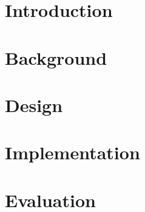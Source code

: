 \documentclass[a4paper,twoside,10pt]{report}
\begin{document}
\newpage


\pagestyle{fancy}
\fancyfoot{}
\fancyfoot[LE,RO]{\thepage}



\chapter{Introduction}


\chapter{Background}


\chapter{Design}


\chapter{Implementation}


\chapter{Evaluation}


\renewcommand\bibname{References}
\printbibliography{}
\end{document}
